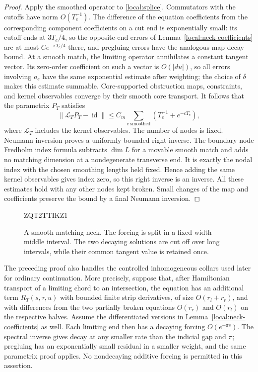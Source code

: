 \documentclass[11pt]{article}
\theoremstyle{definition}
\theoremstyle{remark}
\numberwithin{equation}{section}
\begin{document}
\begin{proof}
Apply the smoothed operator to \eqref{local:splice}.  Commutators with
the cutoffs have norm $O(T_e^{-1})$.  The difference of the equation
coefficients from the corresponding component coefficients on a
cut end is exponentially small: its cutoff ends at $3T_e/4$, so the
opposite-end errors of Lemma~\ref{local:neck-coefficients} are at most
$Ce^{-\pi T_e/4}$ there, and pregluing errors have the analogous
map-decay bound.  At a smooth match, the limiting operator annihilates
a constant tangent vector.  Its zero-order coefficient on such a
vector is $O(|du|)$, so all errors involving $a_e$ have the same
exponential estimate after weighting; the choice of $\delta$ makes
this estimate summable.  Core-supported obstruction maps, constraints,
and kernel observables converge by their smooth core transport.
It follows that the parametrix $P_T$ satisfies
\begin{equation}\label{local:parametrix-error}
 \|\mathcal L_TP_T-\operatorname{id}\|
   \leq C_m\sum_{e\ \mathrm{smoothed}}
                      (T_e^{-1}+e^{-cT_e}),
\end{equation}
where $\mathcal L_T$ includes the kernel observables.  The number of
nodes is fixed.  Neumann inversion proves a uniformly bounded right
inverse.  The boundary-node Fredholm index formula subtracts
$\dim L$ for a movable smooth match and adds no matching dimension
at a nondegenerate transverse end.  It is exactly the nodal index
with the chosen smoothing lengths held fixed.  Hence adding the
same kernel observables gives index zero, so this right inverse is
an inverse.  All these estimates hold with any other nodes kept
broken.  Small changes of the map and coefficients preserve the
bound by a final Neumann inversion.
\end{proof}

\begin{figure}[ht]

ZQT2TTIKZ1
\caption{A smooth matching neck.  The forcing is split in a fixed-width
middle interval.  The two decaying solutions are cut off over long
intervals, while their common tangent value is retained once.}
\label{local:neck-figure}
\end{figure}

The preceding proof also handles the controlled inhomogeneous collars
used later for ordinary continuation.  More precisely, suppose that,
after Hamiltonian transport of a limiting chord to an intersection,
the equation has an additional term $R_T(s,\tau,u)$ with bounded finite
strip derivatives, of size $O(r_l+r_r)$, and with differences from the
two partially broken equations $O(r_r)$ and $O(r_l)$ on the respective
halves.  Assume the differentiated versions in
Lemma~\ref{local:neck-coefficients} as well.  Each limiting end then
has a decaying forcing $O(e^{-\pi s})$.  The spectral inverse gives
decay at any smaller rate than the indicial gap and $\pi$; pregluing
has an exponentially small residual in a smaller weight, and the
same parametrix proof applies.  No nondecaying additive forcing is
permitted in this assertion.
\end{document}
